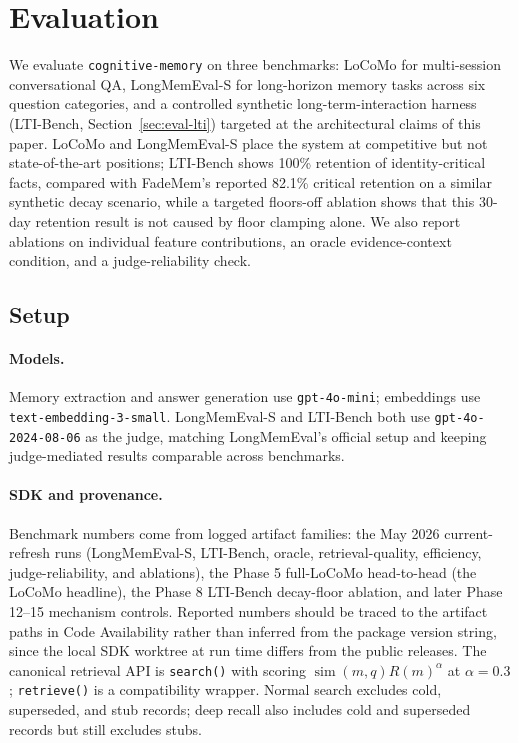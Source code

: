 \documentclass[11pt,a4paper]{article}
\begin{document}
\section{Evaluation}
\label{sec:evaluation}

We evaluate \texttt{cognitive-memory} on three benchmarks: LoCoMo \citep{maharana2024locomo} for multi-session conversational QA, LongMemEval-S \citep{wu2024longmemeval} for long-horizon memory tasks across six question categories, and a controlled synthetic long-term-interaction harness (LTI-Bench, Section~\ref{sec:eval-lti}) targeted at the architectural claims of this paper. LoCoMo and LongMemEval-S place the system at competitive but not state-of-the-art positions; LTI-Bench shows 100\% retention of identity-critical facts, compared with FadeMem's reported 82.1\% critical retention on a similar synthetic decay scenario, while a targeted floors-off ablation shows that this 30-day retention result is not caused by floor clamping alone. We also report ablations on individual feature contributions, an oracle evidence-context condition, and a judge-reliability check.

\subsection{Setup}
\label{sec:eval-setup}

\paragraph{Models.} Memory extraction and answer generation use \texttt{gpt-4o-mini}; embeddings use \texttt{text-embedding-3-small}. LongMemEval-S and LTI-Bench both use \texttt{gpt-4o-2024-08-06} as the judge, matching LongMemEval's official setup and keeping judge-mediated results comparable across benchmarks.

\paragraph{SDK and provenance.} Benchmark numbers come from logged artifact families: the May 2026 current-refresh runs (LongMemEval-S, LTI-Bench, oracle, retrieval-quality, efficiency, judge-reliability, and ablations), the Phase 5 full-LoCoMo head-to-head (the LoCoMo headline), the Phase 8 LTI-Bench decay-floor ablation, and later Phase 12--15 mechanism controls. Reported numbers should be traced to the artifact paths in Code Availability rather than inferred from the package version string, since the local SDK worktree at run time differs from the public releases. The canonical retrieval API is \texttt{search()} with scoring $\operatorname{sim}(m,q) R(m)^\alpha$ at $\alpha=0.3$; \texttt{retrieve()} is a compatibility wrapper. Normal search excludes cold, superseded, and stub records; deep recall also includes cold and superseded records but still excludes stubs.
\end{document}
